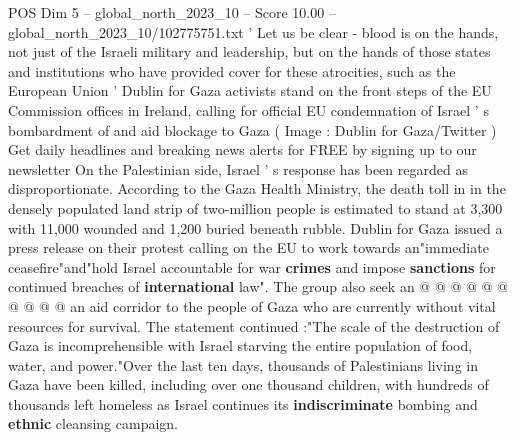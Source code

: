 \begin{textsample}{POS Dim 5 – global\_north\_2023\_10 – Score 10.00 – global\_north\_2023\_10/102775751.txt}  \label{ex:f5_pos_429}
' Let us be clear - blood is on the hands, not just of the Israeli military and leadership, but on the hands of those states and institutions who have provided cover for these atrocities, such as the European Union ' Dublin for Gaza activists stand on the front steps of the EU Commission offices in Ireland, calling for official EU condemnation of Israel ' s bombardment of and aid blockage to Gaza ( Image : Dublin for Gaza/Twitter ) Get daily headlines and breaking news alerts for FREE by signing up to our newsletter On the Palestinian side, Israel ' s response has been regarded as disproportionate.
According to the Gaza Health Ministry, the death toll in in the densely populated land strip of two-million people is estimated to stand at 3,300 with 11,000 wounded and 1,200 buried beneath rubble.
Dublin for Gaza issued a press release on their protest calling on the EU to work towards an"immediate ceasefire"and"hold Israel accountable for war \textbf{crimes} and impose \textbf{sanctions} for continued breaches of \textbf{international} law".
The group also seek an @ @ @ @ @ @ @ @ @ @ an aid corridor to the people of Gaza who are currently without vital resources for survival.
The statement continued :"The scale of the destruction of Gaza is incomprehensible with Israel starving the entire population of food, water, and power."Over the last ten days, thousands of Palestinians living in Gaza have been killed, including over one thousand children, with hundreds of thousands left homeless as Israel continues its \textbf{indiscriminate} bombing and \textbf{ethnic} cleansing campaign.

\end{textsample}
